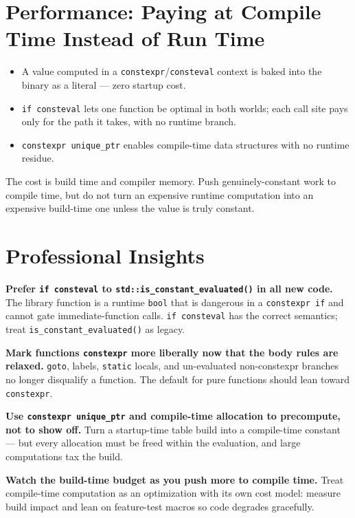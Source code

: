 \section{Performance: Paying at Compile Time Instead of Run Time}

\begin{itemize}
    \item A value computed in a \lstinline|constexpr|/\lstinline|consteval| context is baked into the binary as a literal --- zero startup cost.
    \item \lstinline|if consteval| lets one function be optimal in both worlds; each call site pays only for the path it takes, with no runtime branch.
    \item \lstinline|constexpr unique_ptr| enables compile-time data structures with no runtime residue.
\end{itemize}

The cost is build time and compiler memory. Push genuinely-constant work to compile time, but do not turn an expensive runtime computation into an expensive build-time one unless the value is truly constant.

\section{Professional Insights}

\textbf{Prefer \lstinline|if consteval| to \lstinline|std::is_constant_evaluated()| in all new code.} The library function is a runtime \lstinline|bool| that is dangerous in a \lstinline|constexpr if| and cannot gate immediate-function calls. \lstinline|if consteval| has the correct semantics; treat \lstinline|is_constant_evaluated()| as legacy.

\textbf{Mark functions \lstinline|constexpr| more liberally now that the body rules are relaxed.} \lstinline|goto|, labels, \lstinline|static| locals, and un-evaluated non-constexpr branches no longer disqualify a function. The default for pure functions should lean toward \lstinline|constexpr|.

\textbf{Use \lstinline|constexpr unique_ptr| and compile-time allocation to precompute, not to show off.} Turn a startup-time table build into a compile-time constant --- but every allocation must be freed within the evaluation, and large computations tax the build.

\textbf{Watch the build-time budget as you push more to compile time.} Treat compile-time computation as an optimization with its own cost model: measure build impact and lean on feature-test macros so code degrades gracefully.
